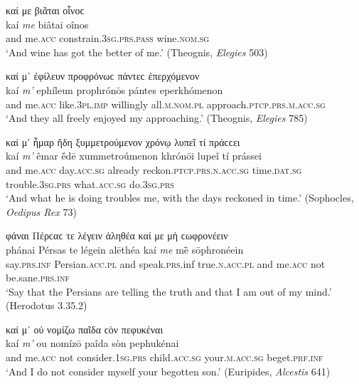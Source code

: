 \begin{exe}
\ex καί με βιᾶται οἶνοϲ\\
\gll kaí \emph{me} biâtai oînos\\
and me.\textsc{acc} constrain.\textsc{3sg.prs.pass} wine.\textsc{nom.sg}\\
\trans `And wine has got the better of me.' (Theognis, \textit{Elegies} 503)
\label{kaime6}
\end{exe}

\begin{exe}
\ex καί μ᾽ ἐφίλευν προφρόνωϲ πάντεϲ ἐπερχόμενον\\
\gll kaí \emph{m'} ephíleun prophrónōs pántes eperkhómenon\\
and me.\textsc{acc} like.\textsc{3pl.imp} willingly all.\textsc{m.nom.pl} approach.\textsc{ptcp.prs.m.acc.sg}\\
\trans `And they all freely enjoyed my approaching.' (Theognis, \textit{Elegies} 785)
\label{kaime7}
\end{exe}

\begin{exe}
\ex καί μ' ἦμαρ ἤδη ξυμμετρούμενον χρόνῳ λυπεῖ τί πράϲϲει\\
\gll kaí \emph{m'} êmar ḗdē xummetroúmenon khrónōi lupeî tí prássei\\
and me.\textsc{acc} day.\textsc{acc.sg} already reckon.\textsc{ptcp.prs.n.acc.sg} time.\textsc{dat.sg} trouble.\textsc{3sg.prs} what.\textsc{acc.sg} do.\textsc{3sg.prs}\\
\trans `And what he is doing troubles me, with the days reckoned in time.' (Sophocles, \textit{Oedipus Rex} 73)
\label{kaime8}
\end{exe}

\begin{exe}
\ex φάναι Πέρϲαϲ τε λέγειν ἀληθέα καί με μὴ ϲωφρονέειν\\
\gll phánai Pérsas te légein alēthéa kaí \emph{me} mḕ sōphronéein\\
say.\textsc{prs.inf} Persian.\textsc{acc.pl} and speak.\textsc{prs.}inf true.\textsc{n.acc.pl} and me.\textsc{acc} not be.sane.\textsc{prs.inf}\\
\trans `Say that the Persians are telling the truth and that I am out of my mind.' (Herodotus 3.35.2)
\label{kaime9}
\end{exe}

\begin{exe}
\ex καί μ᾽ οὐ νομίζω παῖδα ϲὸν πεφυκέναι\\
\gll kaí \emph{m'} ou nomízō paîda sòn pephukénai\\
and me.\textsc{acc} not consider.\textsc{1sg.prs} child.\textsc{acc.sg} your.\textsc{m.acc.sg} beget.\textsc{prf.inf}\\
\trans `And I do not consider myself your begotten son.' (Euripides, \textit{Alcestis} 641)
\label{kaime10}
\end{exe}

